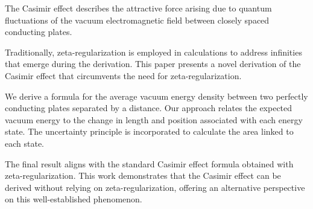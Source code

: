 The Casimir effect describes the attractive force arising due to quantum fluctuations of the vacuum electromagnetic field 
between closely spaced conducting plates. 

Traditionally, zeta-regularization is employed in calculations to address infinities that emerge during the derivation. 
This paper presents a novel derivation of the Casimir effect that circumvents the need for zeta-regularization.

We derive a formula for the average vacuum energy density between two perfectly conducting plates separated by a distance. 
Our approach relates the expected vacuum energy to the change in length and position associated with each energy state. 
The uncertainty principle is incorporated to calculate the area linked to each state. 

The final result aligns with the standard Casimir effect formula obtained with zeta-regularization. 
This work demonstrates that the Casimir effect can be derived without relying on zeta-regularization, 
offering an alternative perspective on this well-established phenomenon.

